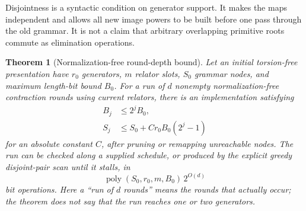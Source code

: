 \documentclass[11pt,letterpaper]{article}
\newtheorem{theorem}{Theorem}[section]
\theoremstyle{definition}
\newcommand{\poly}{\operatorname{poly}}
\begin{document}
Disjointness is a syntactic condition on generator support. It makes the
maps independent and allows all new image powers to be built before one
pass through the old grammar. It is not a claim that arbitrary overlapping
primitive roots commute as elimination operations.

\begin{theorem}[Normalization-free round-depth bound]
\label{thm:roundbound}
Let an initial torsion-free presentation have $r_0$ generators, $m$ relator
slots, $S_0$ grammar nodes, and maximum length-bit bound $B_0$. For a run of
$d$ nonempty normalization-free contraction rounds using current relators,
there is an implementation satisfying
\begin{align}
 B_j&\leq 2^jB_0, \label{eq:Bbound}\\
 S_j&\leq S_0+C r_0B_0(2^j-1) \label{eq:Sbound}
\end{align}
for an absolute constant $C$, after pruning or remapping unreachable nodes.
The run can be checked along a supplied schedule, or produced by the explicit
greedy disjoint-pair scan until it stalls, in
\begin{equation}
 \poly(S_0,r_0,m,B_0)\,2^{O(d)}
 \label{eq:roundtime}
\end{equation}
bit operations. Here a ``run of $d$ rounds'' means the rounds that actually
occur; the theorem does not say that the run reaches one or two generators.
\end{theorem}
\end{document}
